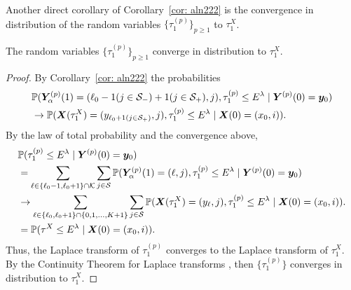 Another direct corollary of Corollary~\ref{cor: aln222} is the convergence in distribution of the random variables \(\{\tau_1^{(p)}\}_{p\geq 1}\) to \(\tau_1^X\). 
\begin{cor}\label{cor: short cor}
	The random variables \(\{\tau_1^{(p)}\}_{p\geq 1}\) converge in distribution to \(\tau_1^X\). 
\end{cor}
\begin{proof}
	By Corollary~\ref{cor: aln222} the probabilities 
	\begin{align}
		&\mathbb P(\boldsymbol Y_{\alpha}^{(p)}(1) = (\ell_0-1(j\in\mathcal{S}_-)+1(j\in\mathcal{S}_+),j),\tau_1^{(p)}\leq E^\lambda
            	 \mid \boldsymbol Y^{(p)}(0) = \boldsymbol y_0) \nonumber
		\\&\to  
			\mathbb P(\boldsymbol X(\tau_1^X) = (y_{\ell_0+1(j\in\mathcal{S}_+)}, j),\tau_1^{(p)}\leq E^\lambda \mid \boldsymbol X(0) = (x_0,i)).\nonumber
	\end{align}
	By the law of total probability and the convergence above, 
	\begin{align}
		&\mathbb P( \tau_1^{(p)}\leq E^\lambda
		\mid \boldsymbol Y^{(p)}(0) = \boldsymbol y_0) \nonumber
		\\&=\sum_{\ell\in\{\ell_0-1,\ell_0+1\}\cap\mathcal K}\sum_{j\in\mathcal{S}}\mathbb P(\boldsymbol Y_{\alpha}^{(p)}(1) = (\ell,j),\tau_1^{(p)}\leq E^\lambda
		\mid \boldsymbol Y^{(p)}(0) = \boldsymbol y_0) \nonumber
		\\&\to  
		\sum_{\ell\in\{\ell_0,\ell_0+1\}\cap\{0,1,\dots,K+1\}}\sum_{j\in\mathcal{S}}\mathbb P(\boldsymbol X(\tau_1^X) = (y_{\ell}, j),\tau_1^{(p)}\leq E^\lambda \mid \boldsymbol X(0) = (x_0,i)).\nonumber
		\\&=\mathbb P(\tau^X\leq E^\lambda \mid \boldsymbol X(0) = (x_0,i) ).
	\end{align}
	Thus, the Laplace transform of \(\tau_1^{(p)}\) converges to the Laplace transform of \(\tau_1^X\). By the Continuity Theorem for Laplace transforms \cite[Chapter XIII, Theorem 2a]{feller1957}, then \(\{\tau_1^{(p)}\}\) converges in distribution to \(\tau_1^X\). 
\end{proof}

